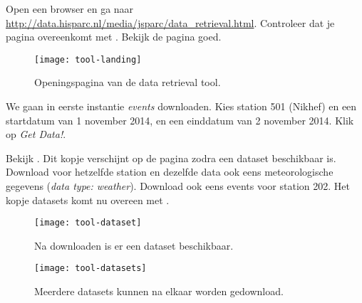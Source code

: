 \begin{questions}
\question Open een browser en ga naar
\url{http://data.hisparc.nl/media/jsparc/data_retrieval.html}.  Controleer
dat je pagina overeenkomt met .  Bekijk de pagina
goed.

\begin{figure}
  \centering
  \texttt{[image: tool-landing]}
  \caption{Openingspagina van de data retrieval tool.}
  \label{fig:tool-landing}
\end{figure}


\question We gaan in eerste instantie \emph{events} downloaden.  Kies
station 501 (Nikhef) en een startdatum van 1 november 2014, en een
einddatum van 2 november 2014. Klik op \emph{Get Data!}.


\question Bekijk . Dit kopje verschijnt op de
pagina zodra een dataset beschikbaar is. Download voor hetzelfde station
en dezelfde data ook eens meteorologische gegevens (\emph{data type:
weather}).  Download ook eens events voor station 202. Het kopje datasets
komt nu overeen met .

\begin{figure}
  \centering
  \texttt{[image: tool-dataset]}
  \caption{Na downloaden is er een dataset beschikbaar.}
  \label{fig:tool-dataset}
\end{figure}

\begin{figure}
  \centering
  \texttt{[image: tool-datasets]}
  \caption{Meerdere datasets kunnen na elkaar worden gedownload.}
  \label{fig:tool-datasets}
\end{figure}



\end{questions}

